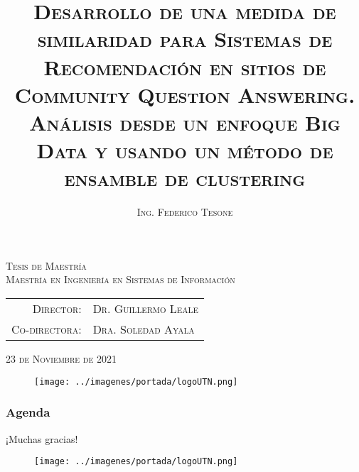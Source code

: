 \documentclass[10pt]{beamer}
\title[]{\textsc{Desarrollo de una medida de similaridad para Sistemas de Recomendación en sitios de Community Question Answering. Análisis desde un enfoque Big Data y usando un método de ensamble de clustering}} %
\author{\textsc{Ing. Federico Tesone}} %
\date{}
\begin{document}
	\begin{frame}[plain]
		 \titlepage{}
		 \date{}

		 \vspace{-45px}

 		\begin{center}
			{\textsc{\textbf\scriptsize Tesis de Maestría}} \\[-5px]
			{\textsc{\tiny Maestría en Ingeniería en Sistemas de Información}} \\
		\end{center}

		\vspace{3px}

		\begin{center}
			\begin{scriptsize}
				\begin{tabular}{rl}
					\textsc{Director:} & \textsc{Dr. Guillermo Leale} \\
					\textsc{Co-directora:} & \textsc{Dra. Soledad Ayala}
				\end{tabular}
			\end{scriptsize}
		\end{center}

 		\begin{center}
			{\tiny \textsc{23 de Noviembre de 2021}}
		\end{center}

		\begin{figure}
			\texttt{[image: ../imagenes/portada/logoUTN.png]}
		\end{figure}
	\end{frame}

	\begin{frame}
		\frametitle{Agenda}
		\tableofcontents[hideallsubsections]
	\end{frame}

	\beamerdefaultoverlayspecification{<+>}

	
	
	
	
	
	
	

	\begin{frame}
		\Huge{\centerline{¡Muchas gracias!}}
		\begin{figure}
			\texttt{[image: ../imagenes/portada/logoUTN.png]}
		\end{figure}
	\end{frame}
\end{document}
